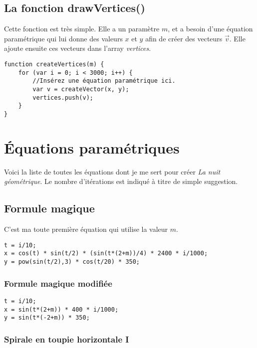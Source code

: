 \subsection{La fonction drawVertices()}

Cette fonction est très simple. Elle a un paramètre $m$, et a besoin d'une équation paramétrique qui lui donne des valeurs $x$ et $y$ afin de créer des vecteurs $\vec{v}$. Elle ajoute ensuite ces vecteurs dans l'array \textit{vertices}.

\begin{lstlisting}
function createVertices(m) {
    for (var i = 0; i < 3000; i++) {
        //Insérez une équation paramétrique ici.
        var v = createVector(x, y);
        vertices.push(v);
    }
}
\end{lstlisting}

\newpage
\section{Équations paramétriques}

Voici la liste de toutes les équations dont je me sert pour créer \textit{La nuit géométrique}. Le nombre d'itérations est indiqué à titre de simple suggestion.

\subsection{Formule magique}

C'est ma toute première équation qui utilise la valeur $m$.

\begin{lstlisting}
t = i/10;
x = cos(t) * sin(t/2) * (sin(t*(2+m))/4) * 2400 * i/1000;
y = pow(sin(t/2),3) * cos(t/20) * 350;
\end{lstlisting}

\subsubsection{Formule magique modifiée}

\begin{lstlisting}
t = i/10;
x = sin(t*(2+m)) * 400 * i/1000;
y = sin(t*(-2+m)) * 350;
\end{lstlisting}

\subsubsection{Spirale en toupie horizontale I}

